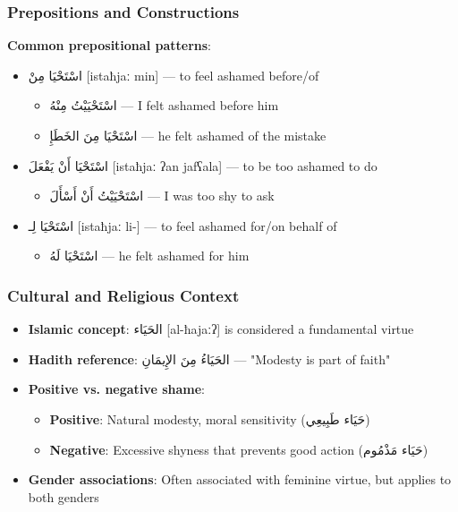\documentclass[letterpaper,12pt]{article}
\begin{document}
\subsubsection*{Prepositions and Constructions}
\textbf{Common prepositional patterns}:
\begin{itemize}
  \item \textarabic{اسْتَحْيَا مِنْ} [istaħjaː min] — to feel ashamed before/of
    \begin{itemize}
      \item \textarabic{اسْتَحْيَيْتُ مِنْهُ} — I felt ashamed before him
      \item \textarabic{اسْتَحْيَا مِنَ الخَطَإِ} — he felt ashamed of the mistake
    \end{itemize}
  \item \textarabic{اسْتَحْيَا أَنْ يَفْعَلَ} [istaħjaː ʔan jafʕala] — to be too ashamed to do
    \begin{itemize}
      \item \textarabic{اسْتَحْيَيْتُ أَنْ أَسْأَلَ} — I was too shy to ask
    \end{itemize}
  \item \textarabic{اسْتَحْيَا لِـ} [istaħjaː li-] — to feel ashamed for/on behalf of
    \begin{itemize}
      \item \textarabic{اسْتَحْيَا لَهُ} — he felt ashamed for him
    \end{itemize}
\end{itemize}

\subsubsection*{Cultural and Religious Context}
\begin{itemize}
  \item \textbf{Islamic concept}: \textarabic{الحَيَاء} [al-ħajaːʔ] is considered a fundamental virtue
  \item \textbf{Hadith reference}: \textarabic{الحَيَاءُ مِنَ الإِيمَانِ} — "Modesty is part of faith"
  \item \textbf{Positive vs. negative shame}:
    \begin{itemize}
      \item \textbf{Positive}: Natural modesty, moral sensitivity (\textarabic{حَيَاء طَبِيعِي})
      \item \textbf{Negative}: Excessive shyness that prevents good action (\textarabic{حَيَاء مَذْمُوم})
    \end{itemize}
  \item \textbf{Gender associations}: Often associated with feminine virtue, but applies to both genders
\end{itemize}
\end{document}
